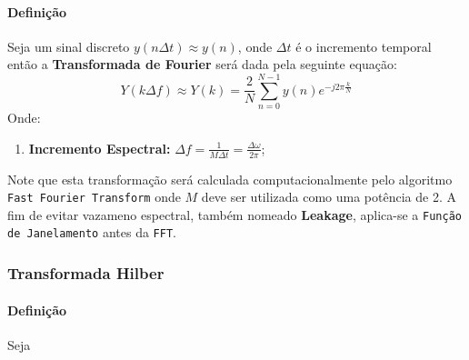 \documentclass{article}
\begin{document}
            \paragraph{Definição}Seja um sinal discreto $y(n\Delta t) \approx y(n)$, onde $\Delta t$ é o incremento temporal então a \textbf{Transformada de Fourier} será dada pela seguinte equação:
                \begin{equation}
                    \boxed{
                        Y(k\Delta f) \approx Y(k) = \frac{2}{N} \sum_{n=0}^{N-1} y(n) e^{-j2\pi \frac{k}{N}}
                    }
                \end{equation}
            Onde:
                \begin{enumerate}[noitemsep]
                    \item \textbf{Incremento Espectral:} $\Delta f = \frac{1}{M\Delta t} = \frac{\Delta\omega}{2\pi}$;
                \end{enumerate}
            Note que esta transformação será calculada computacionalmente pelo algoritmo \texttt{Fast Fourier Transform} onde $M$ deve ser utilizada como uma potência de 2. A fim de evitar vazameno espectral, também nomeado \textbf{Leakage}, aplica-se a \texttt{Função de Janelamento} antes da \texttt{FFT}.

        \subsubsection{Transformada Hilber}
            \paragraph{Definição}Seja
\end{document}
